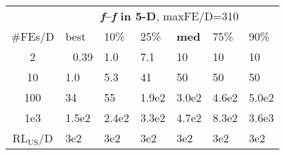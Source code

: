 \begin{tabular}{c|llllll}
 & \multicolumn{6}{|c}{\textbf{\textit{f}\raisebox{-0.35ex}{1}--\textit{f}\raisebox{-0.35ex}{24} in 5-D}, maxFE/D=310}\\
\#FEs/D & best & 10\% & 25\% & \textbf{med} & 75\% & 90\%\\
2 & ~\,0.39 & \hspace*{1ex}1.0 & \hspace*{1ex}7.1 & 10 & 10 & 10\\
10 & \hspace*{1ex}1.0 & \hspace*{1ex}5.3 & 41 & 50 & 50 & 50\\
100 & 34 & 55 & 1.9e2 & 3.0e2 & 4.6e2 & 5.0e2\\
1e3 & 1.5e2 & 2.4e2 & 3.3e2 & 4.7e2 & 8.3e2 & 3.6e3\\
$\text{RL}_{\text{US}}$/D & 3e2 & 3e2 & 3e2 & 3e2 & 3e2 & 3e2
\end{tabular}

